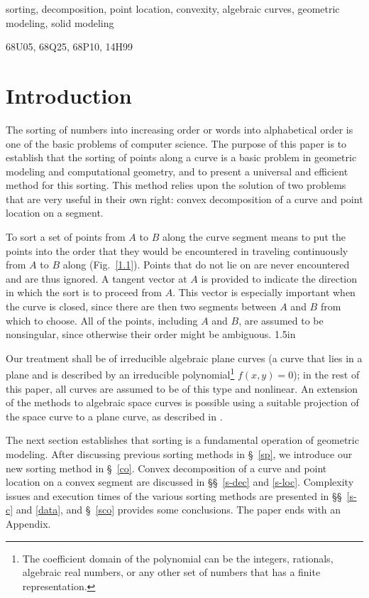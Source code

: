 \begin{keywords}
sorting, decomposition, point location, convexity, algebraic curves,
geometric modeling, solid modeling
\end{keywords}

\begin{AMSMOS}
68U05, 68Q25, 68P10, 14H99
\end{AMSMOS}

\section{Introduction}
%
The sorting of numbers into increasing order or words 
into alphabetical order is one of the basic problems of computer science.  
The purpose of this paper is to establish that the sorting of points
along a curve is a basic problem in geometric modeling and computational 
geometry,
and to present a universal and efficient method for this sorting.
This method relies upon the solution of two problems that are very useful 
in their
own right: convex decomposition of a curve and point location on a segment.

To sort a set of points from $A$ to $B$ along the curve segment  
means to
put the points into the order that they would be encountered in traveling
continuously from $A$ to $B$ along  (Fig.~\ref{1.1}).
Points that do not lie on  are never encountered and are thus 
ignored.
A tangent vector at $A$ is provided to indicate the direction in which the 
sort is to
proceed from $A$. 
This vector is especially important when the curve is closed, since
there are then two segments between $A$ and $B$ from which to choose.
All of the points, including $A$ and $B$, are assumed to be nonsingular,
since otherwise their order might be ambiguous.
%
	{1.5in}

Our treatment shall be of irreducible algebraic plane curves (a curve that 
lies in a plane and is described by an irreducible polynomial\footnote{The 
	coefficient
	domain of the polynomial can be the integers, rationals, algebraic 
	real numbers,
	or any other set of numbers that has a finite representation.}
$f(x,y)=0$); 
in the rest of this paper, all curves are assumed to be of this type and 
nonlinear.
An extension of the methods to algebraic space curves is possible using 
a suitable projection of the space curve to a plane curve, as described 
in \cite{jj}.

The next section establishes that sorting is a fundamental operation of 
geometric modeling.
After discussing previous sorting methods in
\S~\ref{sp},
we introduce our new sorting method in
\S~\ref{co}.
Convex decomposition of a curve
and point location on a convex segment 
are discussed in \S\S~\ref{s-dec} 
and \ref{s-loc}.
Complexity issues and execution times of the
various sorting methods are presented in \S\S~\ref{s-c} and 
\ref{data}, and \S~\ref{sco} provides some conclusions.
The paper ends with an Appendix.


